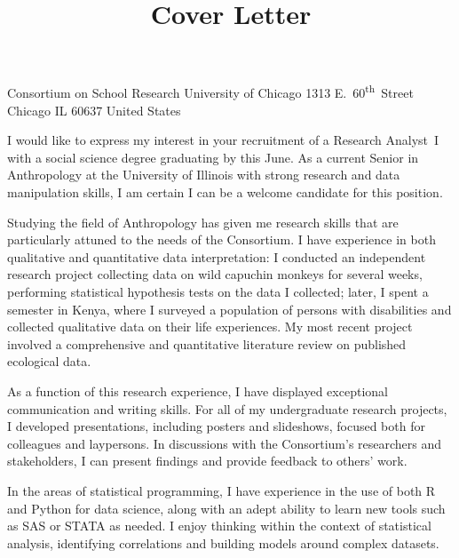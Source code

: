 \title{Cover Letter}

\maketitle

\toaddress
    {Consortium on School Research}
    {University of Chicago}
    {1313 E.\ 60\textsuperscript{th}\ Street}
    {Chicago}
    {IL}
    {60637}
    {United States}

I would like to express my interest in your recruitment of a
Research Analyst~\RN{1} with a social science degree graduating
by this June.
As a current Senior in Anthropology at the University of
Illinois with strong research and data manipulation skills, I am
certain I can be a welcome candidate for this position.

Studying the field of Anthropology has given me research skills that
are particularly attuned to the needs of the Consortium.
I have experience in both qualitative and quantitative data interpretation:
I conducted an independent research project collecting data on wild
capuchin monkeys for several weeks, performing statistical hypothesis
tests on the data I collected; later, I spent a semester in Kenya, where
I surveyed a population of persons with disabilities and collected qualitative
data on their life experiences. My most recent project involved a comprehensive
and quantitative literature review on published ecological data.

As a function of this research experience, I have displayed exceptional
communication and writing skills. For all of my undergraduate research projects,
I developed presentations, including posters and slideshows, focused both for
colleagues and laypersons. In discussions with the Consortium's researchers
and stakeholders, I can present findings and provide feedback to others' work.

In the areas of statistical programming, I have experience in the use of both
R and Python for data science, along with an adept ability to learn new tools
such as SAS or STATA as needed. I enjoy thinking within the context of statistical
analysis, identifying correlations and building models around complex datasets.

